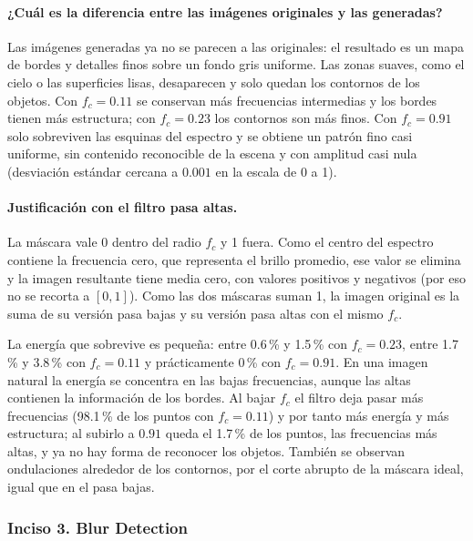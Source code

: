 \documentclass[11pt]{article}
\begin{document}
\paragraph{¿Cuál es la diferencia entre las imágenes originales y las generadas?}
Las imágenes generadas ya no se parecen a las originales: el resultado es un mapa de bordes y detalles finos sobre un fondo gris
uniforme. Las zonas suaves, como el cielo o las superficies lisas, desaparecen y solo quedan los contornos de los objetos. Con
$f_c=0.11$ se conservan más frecuencias intermedias y los bordes tienen más estructura; con $f_c=0.23$ los contornos son más
finos. Con $f_c=0.91$ solo sobreviven las esquinas del espectro y se obtiene un patrón fino casi uniforme, sin contenido
reconocible de la escena y con amplitud casi nula (desviación estándar cercana a $0.001$ en la escala de 0 a 1).

\paragraph{Justificación con el filtro pasa altas.}
La máscara vale 0 dentro del radio $f_c$ y 1 fuera. Como el centro del espectro contiene la frecuencia cero, que representa
el brillo promedio, ese valor se elimina y la imagen resultante tiene media cero, con valores positivos y negativos (por eso
no se recorta a $[0,1]$). Como las dos máscaras suman 1, la imagen original es la suma de su versión pasa bajas y su versión
pasa altas con el mismo $f_c$.

La energía que sobrevive es pequeña: entre 0.6\,\% y 1.5\,\% con $f_c=0.23$, entre 1.7\,\% y 3.8\,\% con $f_c=0.11$ y prácticamente
0\,\% con $f_c=0.91$. En una imagen natural la energía se concentra en las bajas frecuencias, aunque las altas contienen la
información de los bordes. Al bajar $f_c$ el filtro deja pasar más frecuencias (98.1\,\% de los puntos con $f_c=0.11$) y por
tanto más energía y más estructura; al subirlo a $0.91$ queda el 1.7\,\% de los puntos, las frecuencias más altas, y ya no hay
forma de reconocer los objetos. También se observan ondulaciones alrededor de los contornos, por el corte abrupto de la
máscara ideal, igual que en el pasa bajas.



\FloatBarrier
\subsubsection*{Inciso 3. Blur Detection}
\end{document}
